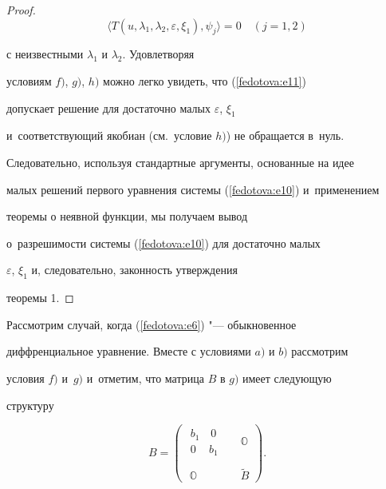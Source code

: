 \begin{proof}
\begin{equation}
\langle T(u, \lambda_1, \lambda_2, \varepsilon, \xi_1), \psi_j\rangle=0\quad (j=1, 2)

\end{equation}

с неизвестными $\lambda_1$ и $\lambda_2.$ Удовлетворяя

условиям $f)$, $g)$, $h)$ можно легко увидеть, что (\ref{fedotova:e11})

допускает решение для достаточно малых $\varepsilon$, $\xi_1$ 

и~соответствующий якобиан (см.~условие $h)$) не обращается в~нуль.

Следовательно, используя стандартные аргументы, основанные на идее

малых решений первого уравнения системы (\ref{fedotova:e10}) и~применением 

теоремы о неявной функции, мы получаем вывод 

о~разрешимости системы (\ref{fedotova:e10}) для достаточно малых

$\varepsilon$, $\xi_1$ и, следовательно, законность утверждения

теоремы 1.

\end{proof}




Рассмотрим случай, когда (\ref{fedotova:e6}) "--- обыкновенное

диффренциальное уравнение. Вместе с условиями $a)$ и $b)$ рассмотрим

условия $f)$ и~$g)$ и~отметим, что матрица $B$ в $g)$ имеет следующую

структуру

\begin{equation}

\label{fedotova:e12}

B=\left(\begin{array}{lll}\begin{array}{ll} b_1\,\,\,\,\,\,0\\

0\,\,\,\,\,\,\,b_1\end{array}&&\mathbb{O}\\ \\

\,\,\mathbb{O}&&\tilde{B}

\end{array}\right).

\end{equation}

